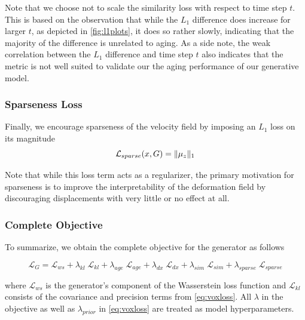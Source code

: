 Note that we choose not to scale the similarity loss with respect to time step $t$. This is based on the observation that while the $L_1$ difference does increase for larger $t$, as depicted in \autoref{fig:l1plots}, it does so rather slowly, indicating that the majority of the difference is unrelated to aging. As a side note, the weak correlation between the $L_1$ difference and time step $t$ also indicates that the metric is not well suited to validate our the aging performance of our generative model.

\subsubsection*{Sparseness Loss}
Finally, we encourage sparseness of the velocity field by imposing an $L_1$ loss on its magnitude
\begin{equation}
	\mathcal{L}_{sparse}( x, G ) = \lVert\mu_z\rVert_1
\end{equation}

Note that while this loss term acts as a regularizer, the primary motivation for sparseness is to improve the interpretability of the deformation field by discouraging displacements with very little or no effect at all.

\subsubsection*{Complete Objective}
To summarize, we obtain the complete objective for the generator as follows

\begin{equation}
	\mathcal{L}_G =
		\mathcal{L}_{ws} +
		\lambda_{kl} \; \mathcal{L}_{kl} +
		\lambda_{age} \; \mathcal{L}_{age} + 
		\lambda_{dx} \; \mathcal{L}_{dx} + 
		\lambda_{sim} \; \mathcal{L}_{sim} + 
		\lambda_{sparse} \; \mathcal{L}_{sparse}
\end{equation}

where $\mathcal{L}_{ws}$ is the generator's component of the Wasserstein loss function and $\mathcal{L}_{kl}$ consists of the covariance and precision terms from \autoref{eq:voxloss}. All $ \lambda $ in the objective as well as $\lambda_{prior}$ in \autoref{eq:voxloss} are treated as model hyperparameters.

